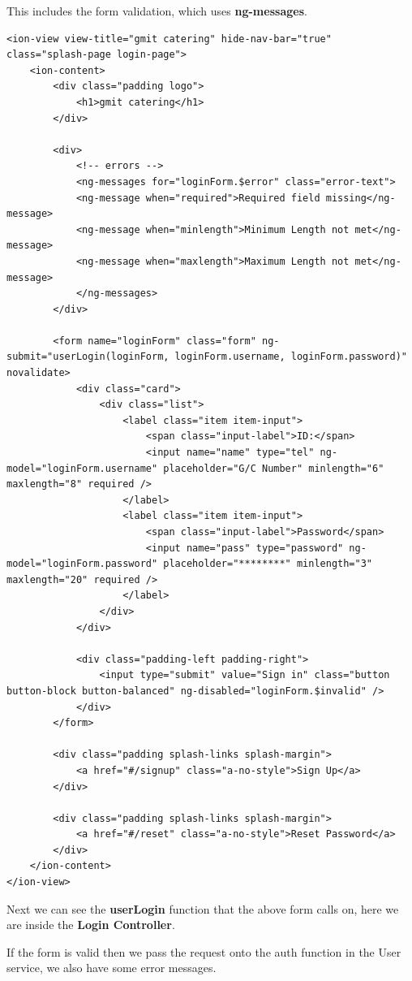 This includes the form validation, which uses \textbf{ng-messages}.
\begin{verbatim}
<ion-view view-title="gmit catering" hide-nav-bar="true" class="splash-page login-page">
    <ion-content>
        <div class="padding logo">
            <h1>gmit catering</h1>
        </div>
    
        <div>
            <!-- errors -->
            <ng-messages for="loginForm.$error" class="error-text">
            <ng-message when="required">Required field missing</ng-message>
            <ng-message when="minlength">Minimum Length not met</ng-message>
            <ng-message when="maxlength">Maximum Length not met</ng-message>
            </ng-messages>
        </div>
    
        <form name="loginForm" class="form" ng-submit="userLogin(loginForm, loginForm.username, loginForm.password)" novalidate>
            <div class="card">
                <div class="list">
                    <label class="item item-input">
                        <span class="input-label">ID:</span>
                        <input name="name" type="tel" ng-model="loginForm.username" placeholder="G/C Number" minlength="6" maxlength="8" required />
                    </label>
                    <label class="item item-input">
                        <span class="input-label">Password</span>
                        <input name="pass" type="password" ng-model="loginForm.password" placeholder="********" minlength="3" maxlength="20" required />
                    </label>
                </div>
            </div>
            
            <div class="padding-left padding-right">
                <input type="submit" value="Sign in" class="button button-block button-balanced" ng-disabled="loginForm.$invalid" />
            </div>
        </form>
    
        <div class="padding splash-links splash-margin">
            <a href="#/signup" class="a-no-style">Sign Up</a>
        </div>
        
        <div class="padding splash-links splash-margin">
            <a href="#/reset" class="a-no-style">Reset Password</a>
        </div>
    </ion-content>
</ion-view>
\end{verbatim}

Next we can see the \textbf{userLogin} function that the above form calls on, here we are inside the \textbf{Login Controller}.

If the form is valid then we pass the request onto the auth function in the User service, we also have some error messages.

